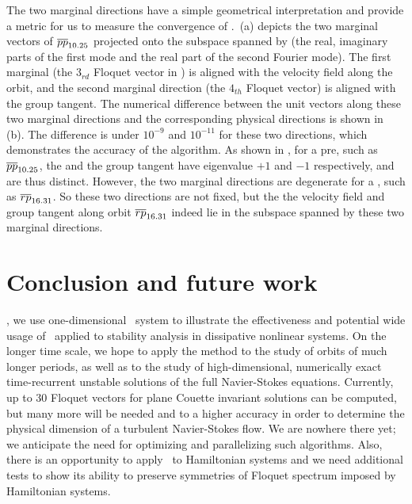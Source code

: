 \documentclass[final,leqno,onefignum,onetabnum]{siamltexmm}
\begin{document}
The two marginal directions have a simple geometrical interpretation and provide
a metric for us to measure the convergence of \ped.
\,(a) depicts the two marginal vectors of
${\overline{pp}}_{10.25}$ projected onto the subspace spanned
by \edit{$[b_1, c_{1}, b_{2}]$}
(the real, imaginary parts of the first mode and the real part of the
second Fourier mode). The first marginal  (the $3_{rd}$
Floquet vector in  ) is aligned with the velocity
field along the orbit, and the second marginal direction (the $4_{th}$
Floquet vector) is aligned with the group tangent. The numerical
difference between the unit vectors along these two marginal directions
and the corresponding physical directions is shown in
\,(b). The difference is under $10^{-9}$ and
$10^{-11}$ for these two directions, which demonstrates the accuracy of
the algorithm.
As shown in , for a pre\po, such as ${\overline{pp}}_{10.25}$,
the  and the group tangent have eigenvalue $+1$ and
$-1$ respectively, and are thus distinct. However, the two marginal
directions are degenerate for a \rpo, such as ${\overline{rp}}_{16.31}$. So these two
directions are not fixed, but the
 the velocity field and
group tangent along orbit ${\overline{rp}}_{16.31}$ indeed lie in the subspace spanned
by these two marginal directions.


\section{Conclusion and future work}
\label{sect:concl}

,
we use one-dimensional \KS\ system to illustrate the effectiveness
and potential wide usage of \ped\ applied to stability analysis
in dissipative nonlinear systems.
On the longer time scale, we hope to apply the method to
the study of orbits of much longer
periods, as well as to the study of high-dimensional, numerically exact
time-recurrent unstable solutions of the full Navier-Stokes equations.
Currently, up to 30 Floquet vectors for plane Couette invariant
solutions can be computed, but many more will be needed
and to a
higher accuracy in order to determine the physical dimension of a turbulent
Navier-Stokes flow. We are nowhere there yet; we anticipate the need for
optimizing and parallelizing such algorithms. Also, there is an opportunity
to apply \ped\ to Hamiltonian systems and we need additional tests to
show its ability to preserve symmetries of Floquet spectrum imposed by
Hamiltonian systems.
\end{document}
